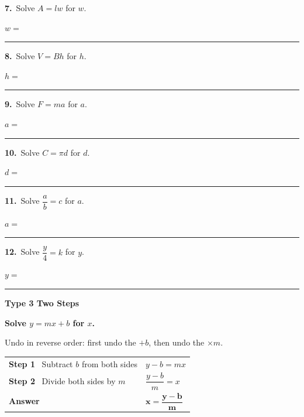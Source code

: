 \documentclass[11pt,letterpaper]{article}
\newcommand{\topicbar}[1]{\needspace{4.5cm}\par\vspace{5mm}
  \begin{tcolorbox}[enhanced,colback=fmtitle,colframe=fmtitle,arc=2mm,left=4mm,top=1.5mm,bottom=1.5mm]
  \color{white}\bfseries\large #1
  \end{tcolorbox}}
\begin{document}
\needspace{3.5cm}\par\vspace{3mm}\noindent \begin{minipage}[t][3.0cm]{0.48\linewidth}\raggedright{\color{fmturn}\bfseries 7.}\ Solve $A = lw$ for $w$.\par\vfill\hfill $w = $\ \rule{3.2cm}{0.4pt}\end{minipage}\hfill \begin{minipage}[t][3.0cm]{0.48\linewidth}\raggedright{\color{fmturn}\bfseries 8.}\ Solve $V = Bh$ for $h$.\par\vfill\hfill $h = $\ \rule{3.2cm}{0.4pt}\end{minipage}\par
\needspace{3.5cm}\par\vspace{3mm}\noindent \begin{minipage}[t][3.0cm]{0.48\linewidth}\raggedright{\color{fmturn}\bfseries 9.}\ Solve $F = ma$ for $a$.\par\vfill\hfill $a = $\ \rule{3.2cm}{0.4pt}\end{minipage}\hfill \begin{minipage}[t][3.0cm]{0.48\linewidth}\raggedright{\color{fmturn}\bfseries 10.}\ Solve $C = \pi d$ for $d$.\par\vfill\hfill $d = $\ \rule{3.2cm}{0.4pt}\end{minipage}\par
\needspace{3.5cm}\par\vspace{3mm}\noindent \begin{minipage}[t][3.0cm]{0.48\linewidth}\raggedright{\color{fmturn}\bfseries 11.}\ Solve $\dfrac{a}{b} = c$ for $a$.\par\vfill\hfill $a = $\ \rule{3.2cm}{0.4pt}\end{minipage}\hfill \begin{minipage}[t][3.0cm]{0.48\linewidth}\raggedright{\color{fmturn}\bfseries 12.}\ Solve $\dfrac{y}{4} = k$ for $y$.\par\vfill\hfill $y = $\ \rule{3.2cm}{0.4pt}\end{minipage}\par
\needspace{9cm}\topicbar{Type 3 \quad Two Steps}
\begin{watchme}\textbf{Solve $y = mx + b$ for $x$.}\par\vspace{1mm}
Undo in reverse order: first undo the $+b$, then undo the $\times m$.\par\vspace{1mm}
\renewcommand{\arraystretch}{2.1}\begin{tabular}{@{}l l@{}}
\textbf{Step 1} \ Subtract $b$ from both sides & $y - b = mx$\\
\textbf{Step 2} \ Divide both sides by $m$ & $\dfrac{y - b}{m} = x$\\
\textbf{Answer} & $\boldsymbol{x = \dfrac{y - b}{m}}$
\end{tabular}\end{watchme}
\end{document}

